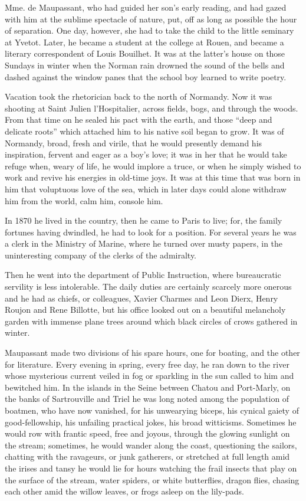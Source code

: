 Mme. de Maupassant, who had guided her son's early reading, and had gazed with him at the sublime spectacle of nature, put, off as long as possible the hour of separation. One day, however, she had to take the child to the little seminary at Yvetot. Later, he became a student at the college at Rouen, and became a literary correspondent of Louis Bouilhet. It was at the latter's house on those Sundays in winter when the Norman rain drowned the sound of the bells and dashed against the window panes that the school boy learned to write poetry.

Vacation took the rhetorician back to the north of Normandy. Now it was shooting at Saint Julien l'Hospitalier, across fields, bogs, and through the woods. From that time on he sealed his pact with the earth, and those “deep and delicate roots” which attached him to his native soil began to grow. It was of Normandy, broad, fresh and virile, that he would presently demand his inspiration, fervent and eager as a boy's love; it was in her that he would take refuge when, weary of life, he would implore a truce, or when he simply wished to work and revive his energies in old-time joys. It was at this time that was born in him that voluptuous love of the sea, which in later days could alone withdraw him from the world, calm him, console him.

In 1870 he lived in the country, then he came to Paris to live; for, the family fortunes having dwindled, he had to look for a position. For several years he was a clerk in the Ministry of Marine, where he turned over musty papers, in the uninteresting company of the clerks of the admiralty.

Then he went into the department of Public Instruction, where bureaucratic servility is less intolerable. The daily duties are certainly scarcely more onerous and he had as chiefs, or colleagues, Xavier Charmes and Leon Dierx, Henry Roujon and Rene Billotte, but his office looked out on a beautiful melancholy garden with immense plane trees around which black circles of crows gathered in winter. 

Maupassant made two divisions of his spare hours, one for boating, and the other for literature. Every evening in spring, every free day, he ran down to the river whose mysterious current veiled in fog or sparkling in the sun called to him and bewitched him. In the islands in the Seine between Chatou and Port-Marly, on the banks of Sartrouville and Triel he was long noted among the population of boatmen, who have now vanished, for his unwearying biceps, his cynical gaiety of good-fellowship, his unfailing practical jokes, his broad witticisms. Sometimes he would row with frantic speed, free and joyous, through the glowing sunlight on the stream; sometimes, he would wander along the coast, questioning the sailors, chatting with the ravageurs, or junk gatherers, or stretched at full length amid the irises and tansy he would lie for hours watching the frail insects that play on the surface of the stream, water spiders, or white butterflies, dragon flies, chasing each other amid the willow leaves, or frogs asleep on the lily-pads. 

